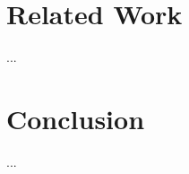 \documentclass{acm_proc_article-sp}
\begin{document}
\section{Related Work}

...

\section{Conclusion}

...



\balancecolumns
\end{document}

